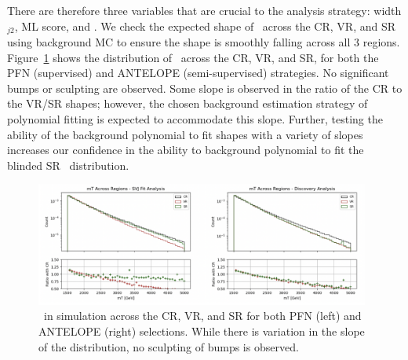 There are therefore three variables that are crucial to the analysis strategy: width$_{j2}$, ML score, and \mt.
We check the expected shape of \mt~across the CR, VR, and SR using background MC to ensure the shape is smoothly falling across all 3 regions.
Figure~\ref{fig:crvrsr_mt} shows the distribution of \mt~across the CR, VR, and SR, for both the PFN (supervised) and ANTELOPE (semi-supervised) strategies.
No significant bumps or sculpting are observed.
Some slope is observed in the ratio of the CR to the VR/SR shapes; however, the chosen background estimation strategy of polynomial fitting is expected to accommodate this slope.
Further, testing the ability of the background polynomial to fit shapes with a variety of slopes increases our confidence in the ability to background polynomial to fit the blinded SR \mt~distribution.%
\begin{figure}[!htbp]
\centering
   \includegraphics[width=0.98\textwidth]{figures/eventsel/mT_regions}
    \caption{\mt~in simulation across the CR, VR, and SR for both PFN (left) and ANTELOPE (right) selections. While there is variation in the slope of the distribution, no sculpting of bumps is observed.
    \label{fig:crvrsr_mt}}
\end{figure}


